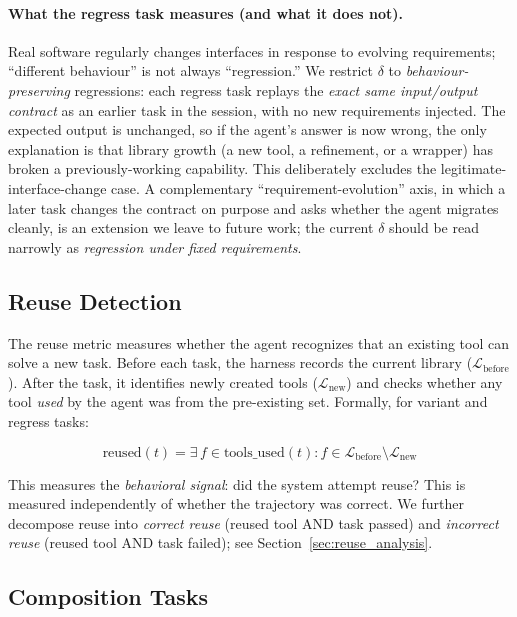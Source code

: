 \documentclass[sigplan,nonacm,natbib=false]{acmart}
\begin{document}
\paragraph{What the regress task measures (and what it does not).}
Real software regularly changes interfaces in response to evolving requirements; ``different behaviour'' is not always ``regression.'' We restrict $\delta$ to \emph{behaviour-preserving} regressions: each regress task replays the \emph{exact same input/output contract} as an earlier task in the session, with no new requirements injected. The expected output is unchanged, so if the agent's answer is now wrong, the only explanation is that library growth (a new tool, a refinement, or a wrapper) has broken a previously-working capability. This deliberately excludes the legitimate-interface-change case. A complementary ``requirement-evolution'' axis, in which a later task changes the contract on purpose and asks whether the agent migrates cleanly, is an extension we leave to future work; the current $\delta$ should be read narrowly as \emph{regression under fixed requirements}.

\subsection{Reuse Detection}
\label{sec:reuse}

The reuse metric measures whether the agent recognizes that an existing tool can solve a new task. Before each task, the harness records the current library ($\mathcal{L}_{\text{before}}$). After the task, it identifies newly created tools ($\mathcal{L}_{\text{new}}$) and checks whether any tool \emph{used} by the agent was from the pre-existing set. Formally, for variant and regress tasks:

\begin{equation}
\text{reused}(t) = \exists\, f \in \text{tools\_used}(t) : f \in \mathcal{L}_{\text{before}} \setminus \mathcal{L}_{\text{new}}
\end{equation}

This measures the \emph{behavioral signal}: did the system attempt reuse? This is measured independently of whether the trajectory was correct. We further decompose reuse into \emph{correct reuse} (reused tool AND task passed) and \emph{incorrect reuse} (reused tool AND task failed); see Section~\ref{sec:reuse_analysis}.

\subsection{Composition Tasks}
\label{sec:compose}
\end{document}
